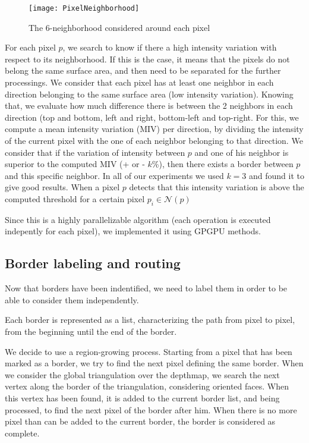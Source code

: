\documentclass[11pt,fleqn]{book} %
\begin{document}
\begin{figure}[ht]
\centering\texttt{[image: PixelNeighborhood]}
\caption{The 6-neighborhood considered around each pixel}
\label{fig:pixel_neighborhood}
\end{figure}

For each pixel $p$, we search to know if there a high intensity variation with respect to its neighborhood. If this is the case, it means that the pixels do not belong the same surface area, and then need to be separated for the further processings.
We consider that each pixel has at least one neighbor in each direction belonging to the same surface area (low intensity variation). Knowing that, we evaluate how much difference there is between the 2 neighbors in each direction (top and bottom, left and right, bottom-left and top-right.
For this, we compute a mean intensity variation (MIV) per direction, by dividing the intensity of the current pixel with the one of each neighbor belonging to that direction. We consider that if the variation of intensity between $p$ and one of his neighbor is superior to the computed MIV (+ or - $k$\%), then there exists a border between $p$ and this specific neighbor. In all of our experiments we used $k = 3$ and found it to give good results.
When a pixel $p$ detects that this intensity variation is above the computed threshold for a certain pixel $p_i \in \mathcal{N}(p)$

Since this is a highly parallelizable algorithm (each operation is executed indepently for each pixel), we implemented it using GPGPU methods.

\subsection{Border labeling and routing}
Now that borders have been indentified, we need to label them in order to be able to consider them independently. 

Each border is represented as a list, characterizing the path from pixel to pixel, from the beginning until the end of the border.

We decide to use a region-growing process. Starting from a pixel that has been marked as a border, we try to find the next pixel defining the same border. When we consider the global triangulation over the depthmap, we search the next vertex along the border of the triangulation, considering oriented faces.
When this vertex has been found, it is added to the current border list, and being processed, to find the next pixel of the border after him.
When there is no more pixel than can be added to the current border, the border is considered as complete.
\end{document}
